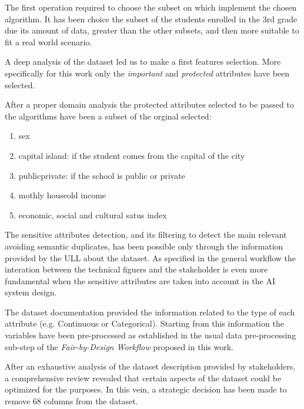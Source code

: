 \documentclass[12pt,a4paper,openright,twoside]{book}
\begin{document}
The first operation required to choose the subset on which implement the chosen algorithm. It has been choice the subset of the students enrolled in the 3rd grade due its amount of data, greater than the other subsets, and then more suitable to fit a real world scenario.

A deep analysis of the dataset led us to make a first features selection. More specifically for this work only the \emph{important} and \emph{protected} attributes have been selected.

After a proper domain analysis the protected attributes selected to be passed to the algorithms have been a subset of the orginal selected:

\begin{enumerate}

    \item sex

    \item capital island: if the student comes from the capital of the city

    \item public\textunderscore private: if the school is public or private
    
    \item mothly houseold income

    \item economic, social and cultural satus index

\end{enumerate}

The sensitive attributes detection, and its filtering to detect the main relevant avoiding semantic duplicates, has been possible only through the information provided by the ULL about the dataset. As specified in the general workflow the interation between the technical figuers and the stakeholder is even more fundamental when the sensitive attributes are taken into account in the AI system design.

The dataset documentation provided the information related to the type of each attribute (e.g. Continuous or Categorical). Starting from this information the variables have been pre-processed as established in the usual data pre-processing sub-step of the \emph{Fair-by-Design Workflow} proposed in this work.

After an exhaustive analysis of the dataset description provided by stakeholders, a comprehensive review revealed that certain aspects of the dataset could be optimized for the purposes. In this vein, a strategic decision has been made to remove 68 columns from the dataset.
\end{document}
